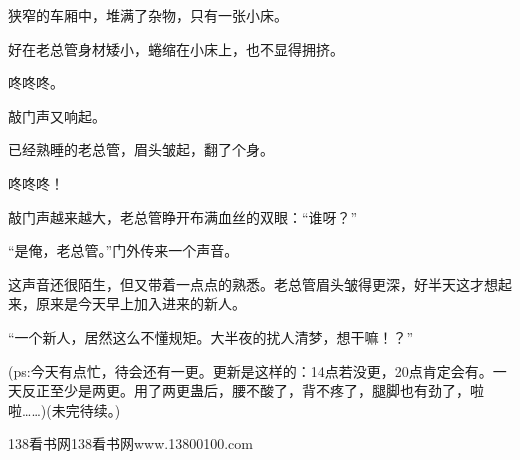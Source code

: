 \begin{this_body}
狭窄的车厢中，堆满了杂物，只有一张小床。

好在老总管身材矮小，蜷缩在小床上，也不显得拥挤。

咚咚咚。

敲门声又响起。

已经熟睡的老总管，眉头皱起，翻了个身。

咚咚咚！

敲门声越来越大，老总管睁开布满血丝的双眼：“谁呀？”

“是俺，老总管。”门外传来一个声音。

这声音还很陌生，但又带着一点点的熟悉。老总管眉头皱得更深，好半天这才想起来，原来是今天早上加入进来的新人。

“一个新人，居然这么不懂规矩。大半夜的扰人清梦，想干嘛！？”

(ps:今天有点忙，待会还有一更。更新是这样的：14点若没更，20点肯定会有。一天反正至少是两更。用了两更蛊后，腰不酸了，背不疼了，腿脚也有劲了，啦啦……)(未完待续。)

138看书网138看书网www.13800100.com

\end{this_body}

